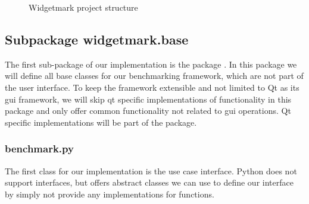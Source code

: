 \begin{figure}[h]
    \centering
    \caption{Widgetmark project structure}
    \label{fig:application:implementation:structure}
\end{figure}

\subsection{Subpackage widgetmark.base}

The first sub-package of our implementation is the package
. In this package we will define all base
classes for our benchmarking framework, which are not part of the user
interface. To keep the framework extensible and not limited to Qt as its
\gls{gui} framework, we will skip qt specific implementations of functionality
in this package and only offer common functionality not related to \gls{gui}
operations. Qt specific implementations will be part of the
 package.

\subsubsection*{benchmark.py}

The first class for our implementation is the use case interface. Python does
not support interfaces, but offers abstract classes we can use to define our
interface by simply not provide any implementations for functions.

